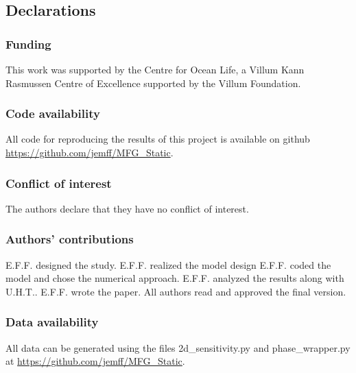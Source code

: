 \documentclass[referee,natbib,smallcondensed]{svjour3}     %
\begin{document}
\subsection*{Declarations}

\subsubsection*{Funding}
This work was supported by the Centre for Ocean Life,
a Villum Kann Rasmussen Centre of Excellence supported
by the Villum Foundation.
\subsubsection*{Code availability}
All code for reproducing the results of this project is available on github \url{https://github.com/jemff/MFG_Static}.
\subsubsection*{Conflict of interest}
The authors declare that they have no conflict of interest.
\subsubsection*{Authors' contributions}
E.F.F. designed the study. E.F.F. realized the model design E.F.F. coded the model and chose the numerical approach. E.F.F. analyzed the results along with U.H.T.. E.F.F. wrote the paper. All authors read and approved the final version.
\subsubsection*{Data availability}
All data can be generated using the files 2d_sensitivity.py and phase_wrapper.py at \url{https://github.com/jemff/MFG_Static}.

\appendix

%
%
%
\end{document}
